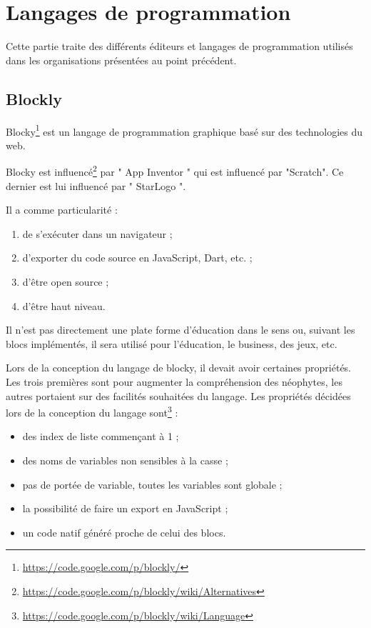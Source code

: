 \section{Langages de programmation}
Cette partie traite des différents éditeurs et langages de programmation utilisés dans les organisations présentées au point précédent.
\subsection{Blockly}
\label{blockly}
Blocky\footnote{\url{https://code.google.com/p/blockly/}} est un langage de programmation graphique basé sur des technologies du web. 

Blocky est influencé\footnote{\url{https://code.google.com/p/blockly/wiki/Alternatives}} par " App Inventor " qui est influencé par "Scratch". Ce dernier est lui influencé par " StarLogo ".

Il a comme particularité :
\begin{enumerate}
\item de s'exécuter dans un navigateur ;
\item d'exporter du code source en JavaScript, Dart, etc. ;
\item d'être open source ;
\item d'être haut niveau.
\end{enumerate}

Il n'est pas directement une plate forme d'éducation dans le sens ou, suivant les blocs implémentés, il sera utilisé pour l'éducation, le business, des jeux, etc.

Lors de la conception du langage de blocky, il devait avoir certaines propriétés. Les trois premières sont pour augmenter la compréhension des néophytes, les autres portaient sur des facilités souhaitées du langage. Les propriétés décidées lors de la conception du langage sont\footnote{\url{https://code.google.com/p/blockly/wiki/Language}} :

\begin{itemize}
  \item des index de liste commençant à 1 ;
  \item des noms de variables non sensibles à la casse ;
  \item pas de portée de variable, toutes les variables sont globale ;
  \item la possibilité de faire un export en JavaScript ;
  \item un code natif généré proche de celui des blocs.
\end{itemize}

